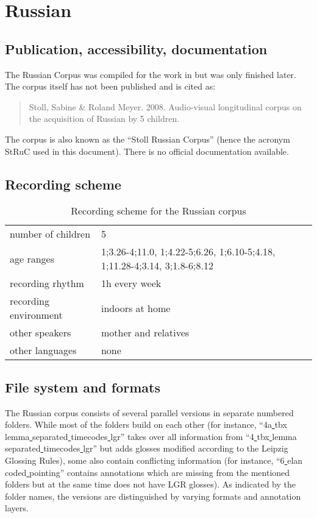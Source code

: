\documentclass[a4paper, 11pt]{book}
\newcommand{\und}{\underline{{ }}\hspace{0.2mm}}	%
\begin{document}
\section{Russian}
\label{sec:Russian}

\subsection{Publication, accessibility, documentation}

The Russian Corpus \citep{Stoll_etal2008a} was compiled for the work in \citet{Stoll2001a} but was only finished later. The corpus itself has not been published and is cited as:

\begin{quote}
	Stoll, Sabine \& Roland Meyer. 2008. Audio-visual longitudinal corpus on the acquisition of Russian by 5 children.
\end{quote}

\noindent The corpus is also known as the “Stoll Russian Corpus” (hence the acronym StRuC used in this document). There is no official documentation available. 


\subsection{Recording scheme}

\begin{table}[ht!]
	\centering
	\begin{tabular}{ll}
		\toprule
		number of children 	& 5 \\
		age ranges 			& 1;3.26-4;11.0, 1;4.22-5;6.26, 1;6.10-5;4.18, 1;11.28-4;3.14, 3;1.8-6;8.12 \\
		recording rhythm 	& 1h every week \\
		recording environment & indoors at home \\
		other speakers 		& mother and relatives \\
		other languages		& none \\
		\bottomrule
	\end{tabular}
	\caption{Recording scheme for the Russian corpus}
	\label{tab:Russian recording scheme}
\end{table}


\subsection{File system and formats}

The Russian corpus consists of several parallel versions in separate numbered folders. While most of the folders build on each other (for instance, “4a\und tbx\und lemma\und separated\und timecodes\und lgr” takes over all information from “4\und tbx\und lemma\und separated\und timecodes\und lgr” but adds glosses modified according to the Leipzig Glossing Rules), some also contain conflicting information (for instance, “6\und elan\und coded\und pointing” contains annotations which are missing from the mentioned folders but at the same time does not have LGR glosses). As indicated by the folder names, the versions are distinguished by varying formats and annotation layers. 
\end{document}
